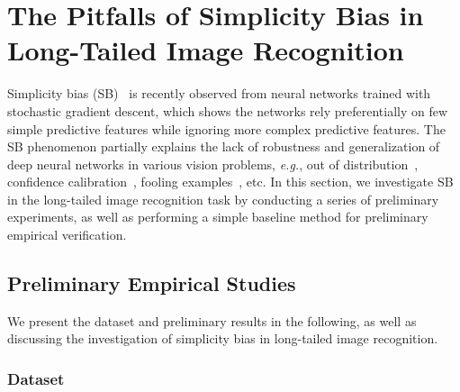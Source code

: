 \documentclass[10pt,journal,compsoc]{IEEEtran}
\newcommand{\eg}{\emph{e.g.}}
\begin{document}
\section{The Pitfalls of Simplicity Bias in Long-Tailed Image Recognition}\label{sec:SB}

Simplicity bias (SB)~\cite{simpBiasNIPs20} is recently observed from neural networks trained with stochastic gradient descent, which shows the networks rely preferentially on few simple predictive features while ignoring more complex predictive features. The SB phenomenon partially explains the lack of robustness and generalization of deep neural networks in various vision problems, \eg, out of distribution~\cite{OOD}, confidence calibration~\cite{calibICML}, fooling examples~\cite{foolCVPR15}, etc. In this section, we investigate SB in the long-tailed image recognition task by conducting a series of preliminary experiments, as well as performing a simple baseline method for preliminary empirical verification.

\subsection{Preliminary Empirical Studies}

We present the dataset and preliminary results in the following, as well as discussing the investigation of simplicity bias in long-tailed image recognition.

\subsubsection{Dataset}
\end{document}
